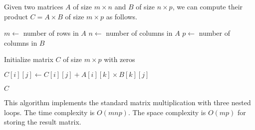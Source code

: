   \begin{algo}
    Given two matrices $A$ of size $m \times n$ and $B$ of size $n \times p$, we can compute their product $C = A \times B$ of size $m \times p$ as follows.
    \begin{algorithmic}[1]
       
        \State $m \gets$ number of rows in $A$
        \State $n \gets$ number of columns in $A$ 
        \State $p \gets$ number of columns in $B$
        
        \State Initialize matrix $C$ of size $m \times p$ with zeros 
        
         
           
             
              \State $C[i][j] \gets C[i][j] + A[i][k] \times B[k][j]$ 
            \EndFor
          \EndFor
        \EndFor
        
        \State \Return $C$ 
      \EndProcedure
    \end{algorithmic}
    This algorithm implements the standard matrix multiplication with three nested loops. The time complexity is $O(m n p)$. The space complexity is $O(m p)$ for storing the result matrix. 
  \end{algo}

